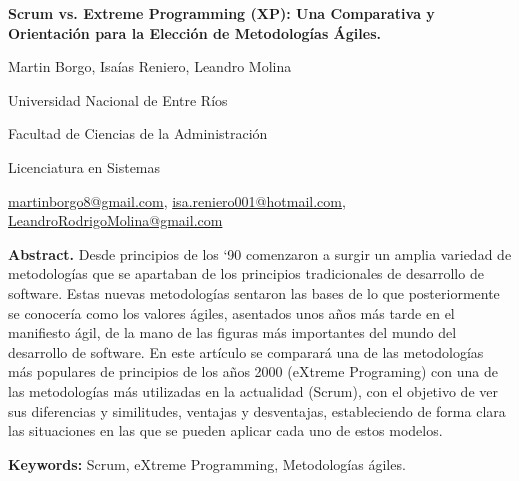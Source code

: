 \documentclass[a4paper,10pt]{article}
\begin{document}
	\pagestyle{empty}
	\begin{titlepage}
		\centering
		\vspace*{1.5cm}
		{\fontsize{14}{17}\bfseries Scrum vs. Extreme Programming (XP): Una Comparativa y Orientación para la Elección de Metodologías Ágiles.\par}
		{\small Martin Borgo, Isaías Reniero, Leandro Molina\par}
		{\normalsize Universidad Nacional de Entre Ríos\par}
		{\normalsize Facultad de Ciencias de la Administración\par}
		{\normalsize Licenciatura en Sistemas\par}
		{\small \href{mailto:martinborgo8@gmail.com}{martinborgo8@gmail.com}, \href{mailto:isa.reniero001@hotmail.com}{isa.reniero001@hotmail.com}, \href{mailto:LeandroRodrigoMolina@gmail.com}{LeandroRodrigoMolina@gmail.com}\par}
		{\small \justify\textbf{Abstract.} Desde principios de los ‘90 comenzaron a surgir un amplia variedad de metodologías que se apartaban de los principios tradicionales de desarrollo de software. Estas nuevas metodologías sentaron las bases de lo que posteriormente se conocería como los valores ágiles, asentados unos años más tarde en el manifiesto ágil, de la mano de las figuras más importantes del mundo del desarrollo de software. En este artículo se comparará una de las metodologías más populares de principios de los años 2000 (eXtreme Programing) con una de las metodologías más utilizadas en la actualidad (Scrum), con el objetivo de ver sus diferencias y similitudes, ventajas y desventajas, estableciendo de forma clara las situaciones en las que se pueden aplicar cada uno de estos modelos.\par}
		
		{\small \textbf{Keywords:} Scrum, eXtreme Programming, Metodologías ágiles. \par}
	\end{titlepage}
	
\end{document}
